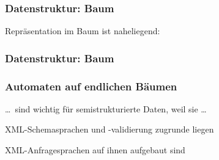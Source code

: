     \begin{frame}
      \frametitle{Datenstruktur: Baum}
      
      \hspace*{\fill}
      \Bsp
      \par\bigskip\bigskip
      Repräsentation im Baum ist naheliegend:
      \begin{center}
      \end{center}

    \end{frame}

    \begin{frame}
      \frametitle{Datenstruktur: Baum}
      
      \hspace*{\fill}
      \Bsp
      \par\bigskip\bigskip
      \begin{center}
      \end{center}

    \end{frame}

    \begin{frame}
      \frametitle{Automaten auf endlichen Bäumen}
      
      \dots\ sind wichtig für semistrukturierte Daten, weil sie \dots
      \begin{Itemize}
        \item
          XML-Schemasprachen und -validierung zugrunde liegen
        \item
          XML-Anfragesprachen auf ihnen aufgebaut sind
      \end{Itemize}


    \end{frame}

